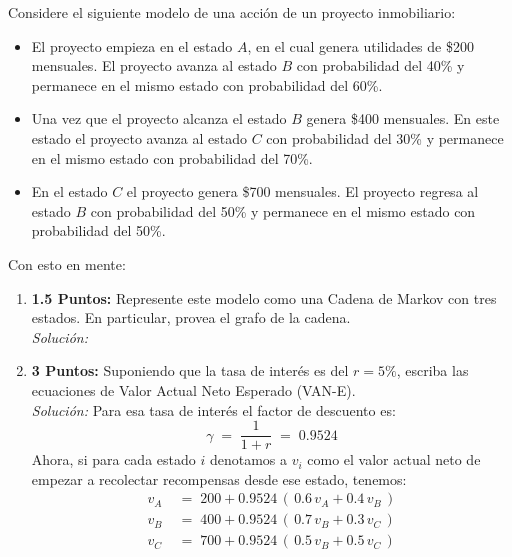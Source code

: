 \documentclass[ a4paper, twoside, 11pt]{article}
\begin{document}
\begin{problem}
Considere el siguiente modelo de una acci\'on de un proyecto inmobiliario: 
\begin{itemize}
\item El proyecto empieza en el estado $A$, en el cual genera utilidades de \$200 mensuales. \linebreak El proyecto avanza al estado $B$ con probabilidad del 40\% y permanece en el mismo estado con probabilidad del 60\%. 
\item Una vez que el proyecto alcanza el estado $B$ genera \$400 mensuales. En este estado el proyecto avanza al estado $C$ con probabilidad del 30\% y permanece en el mismo estado con probabilidad del 70\%. 
\item En el estado $C$ el proyecto genera \$700 mensuales. El proyecto regresa al estado $B$ con probabilidad del 50\% y permanece en el mismo estado con probabilidad del 50\%. 
\end{itemize}

Con esto en mente: 
\begin{enumerate}[label=\textbf{\alph*)}]
\item \textbf{1.5 Puntos:} Represente este modelo como una Cadena de Markov con tres estados. \linebreak En particular, provea el grafo de la cadena. \\[1ex] \emph{Soluci\'on:} 

\begin{figure}[htb]
\centering
\def\svgwidth{0.9\columnwidth}

\end{figure}

\item \textbf{3 Puntos:} Suponiendo que la tasa de inter\'es es del $r = 5\%$, escriba las ecuaciones de Valor Actual Neto Esperado (VAN-E).  \\[1ex] \emph{Soluci\'on:} Para esa tasa de inter\'es el factor de descuento es: 
\[
\gamma \; = \; \frac{1}{1 + r} \; = \; 0.9524
\]
Ahora, si para cada estado $i$ denotamos a $v_i$ como el valor actual neto de empezar a recolectar recompensas desde ese estado, tenemos:
\begin{align*}
v_A \; & = \; 200 + 0.9524 \, ( \, 0.6 \, v_A + 0.4 \, v_B \, ) \\
v_B \; & = \; 400 + 0.9524 \, ( \, 0.7 \, v_B + 0.3 \, v_C \, ) \\
v_C \; & = \; 700 + 0.9524 \, ( \, 0.5 \, v_B + 0.5 \, v_C \, )
\end{align*}


\end{enumerate}
\end{problem}
\end{document}
